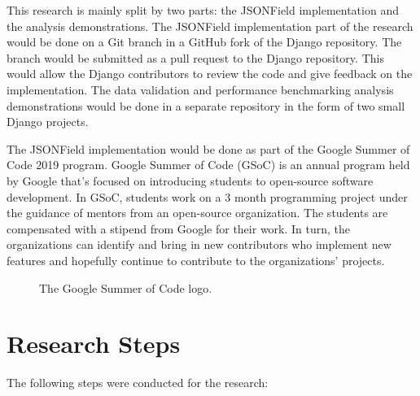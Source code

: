 This research is mainly split by two parts: the JSONField implementation and
the analysis demonstrations. The JSONField implementation part of the research
would be done on a Git branch in a GitHub fork of the Django repository. The
branch would be submitted as a pull request to the Django repository. This
would allow the Django contributors to review the code and give feedback on the
implementation. The data validation and performance benchmarking analysis
demonstrations would be done in a separate repository in the form of two small
Django projects.


The JSONField implementation would be done as part of the Google Summer of Code
2019 program. Google Summer of Code (GSoC) is an annual program held by Google
that's focused on introducing students to open-source software development. In
GSoC, students work on a 3 month programming project under the guidance of
mentors from an open-source organization. The students are compensated with a
stipend from Google for their work. In turn, the organizations can identify and
bring in new contributors who implement new features and hopefully continue to
contribute to the organizations' projects.

\begin{figure}
	\centering
	\caption{The Google Summer of Code logo.}
	\label{fig:gsoc}
\end{figure}

\section{Research Steps}

The following steps were conducted for the research:


